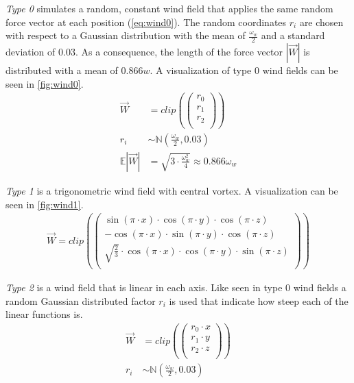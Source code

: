 \newline
\emph{Type 0} simulates a random, constant wind field that applies the same random force vector at each position (\cref{eq:wind0}). 
The random coordinates $r_i$ are chosen with respect to a Gaussian distribution with the mean of $\frac{\omega_w}{2}$ and a standard deviation of $0.03$. 
As a consequence, the length of the force vector $|\overrightarrow{W}|$ is distributed with a mean of $0.866w$. 
A visualization of type 0 wind fields can be seen in \cref{fig:wind0}.
\begin{align} \label{eq:wind0}
	\overrightarrow{W} &= clip(\left(
	\begin{array}{c}
		r_0\\
		r_1\\
		r_2\\
	\end{array}
	\right))\\
	r_i &\sim \mathbb{N}(\frac{\omega_w}{2}, 0.03)\\
	\mathbb{E}|\overrightarrow{W}| &= \sqrt{3 \cdot \frac{\omega_w^2}{4}} \approx 0.866 \omega_w
\end{align}

\newpage

\emph{Type 1} is a trigonometric wind field with central vortex. A visualization can be seen in \cref{fig:wind1}.
\begin{align} \label{eq:wind1}
	\overrightarrow{W} = clip(\left(
	\begin{array}{c}
		\sin(\pi \cdot x) \cdot \cos(\pi \cdot y) \cdot \cos(\pi \cdot z)\\
		- \cos(\pi \cdot x) \cdot \sin(\pi \cdot y) \cdot \cos(\pi \cdot z)\\
		\sqrt{\frac{2}{3}} \cdot \cos(\pi \cdot x) \cdot \cos(
		\pi \cdot y) \cdot \sin(\pi \cdot z)\\
	\end{array}
	\right))
\end{align}
\newline

\emph{Type 2} is a wind field that is linear in each axis. 
Like seen in type 0 wind fields a random Gaussian distributed factor $r_i$ is used that indicate how steep each of the linear functions is.
\begin{align}
	\overrightarrow{W} &= clip(\left(
	\begin{array}{c}
		r_0 \cdot x\\
		r_1 \cdot y\\
		r_2 \cdot z\\
	\end{array}
	\right))\\
	r_i &\sim \mathbb{N}(\frac{\omega_w}{2}, 0.03)
\end{align}
\newline

